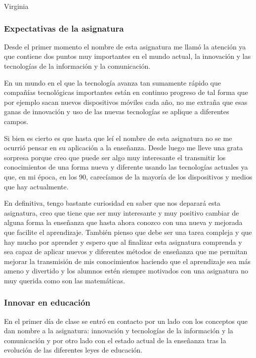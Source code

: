 \begin{opin}{\virgicolor}{Virginia}

\subsubsection{Expectativas de la asignatura}
Desde el primer momento el nombre de esta asignatura me llamó la atención ya que contiene dos puntos muy importantes en el mundo actual, la innovación y las tecnologías de la información y la comunicación. 

En un mundo en el que la tecnología avanza tan sumamente rápido que compañías tecnológicas importantes están en continuo progreso de tal forma que por ejemplo sacan nuevos dispositivos móviles cada año, no me extraña que esas ganas de innovación y uso de las nuevas tecnologías se aplique a diferentes campos. 

Si bien es cierto es que hasta que leí el nombre de esta asignatura no se me ocurrió pensar en su aplicación a la enseñanza. Desde luego me lleve una grata sorpresa porque creo que puede ser algo muy interesante el transmitir los conocimientos de una forma nueva y diferente usando las tecnologías actuales ya que, en mi época, en los 90, carecíamos de la mayoría de los dispositivos y medios que hay actualmente. 

En definitiva, tengo bastante curiosidad en saber que nos deparará esta asignatura, creo que tiene que ser muy interesante y muy positivo cambiar de alguna forma la enseñanza que hasta ahora conozco con una nueva y mejorada que facilite el aprendizaje. También pienso que debe ser una tarea compleja y que hay mucho por aprender y espero que al finalizar esta asignatura comprenda y sea capaz de aplicar nuevos y diferentes métodos de enseñanza que me permitan mejorar la transmisión de mis conocimientos haciendo que el aprendizaje sea más ameno y divertido y los alumnos estén siempre motivados con una asignatura no muy querida como son las matemáticas.


\subsubsection{Innovar en educación}

En el primer día de clase se entró en contacto por un lado con los conceptos que dan nombre a la asignatura: innovación y tecnologías de la información y la comunicación y por otro lado con el estado actual de la enseñanza tras la evolución de las diferentes leyes de educación.


\end{opin}
